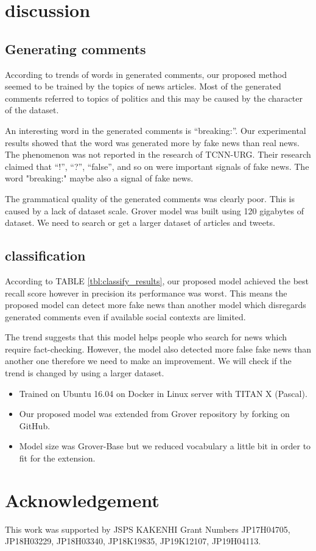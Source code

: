 \documentclass[conference]{IEEEtran}
\begin{document}
\section{discussion}
\subsection{Generating comments}
According to trends of words in generated comments,
our proposed method seemed to be trained by the topics of news articles.
Most of the generated comments referred to topics of politics and this may be caused by the character of the dataset.

An interesting word in the generated comments is ``breaking:''.
Our experimental results showed that the word was generated more by fake news than real news.
The phenomenon was not reported in the research of TCNN-URG\cite{ijcai2018-533}.
Their research claimed that ``!'', ``?'', ``false'', and so on were important signals of fake news.
The word "breaking:" maybe also a signal of fake news.

The grammatical quality of the generated comments was clearly poor.
This is caused by a lack of dataset scale. 
Grover model was built using 120 gigabytes of dataset\cite{NIPS2019_9106}.
We need to search or get a larger dataset of articles and tweets.

\subsection{classification}
According to TABLE \ref{tbl:classify_results}, our proposed model achieved the best recall score however in precision its performance was worst.
This means the proposed model can detect more fake news than another model which disregards generated comments even if available social contexts are limited. 

The trend suggests that this model helps people who search for news which require fact-checking. 
However, the model also detected more false fake news than another one therefore we need to make an improvement.
We will check if the trend is changed by using a larger dataset.

\label{app:settings}
\begin{itemize}[]
    \item Trained on Ubuntu 16.04 on Docker in Linux server with TITAN X (Pascal).
    \item Our proposed model was extended from Grover repository by forking on GitHub.
    \item Model size was Grover-Base but we reduced vocabulary a little bit in order to fit for the extension.
\end{itemize}

\section*{Acknowledgement}
This work was supported by JSPS KAKENHI Grant Numbers JP17H04705, JP18H03229, JP18H03340, JP18K19835, JP19K12107, JP19H04113.



\end{document}
